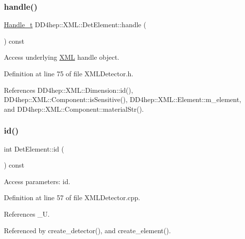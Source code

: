\subsubsection{\texorpdfstring{handle()}{handle()}}
{\footnotesize\ttfamily \hyperlink{class_d_d4hep_1_1_x_m_l_1_1_handle__t}{Handle\+\_\+t} D\+D4hep\+::\+X\+M\+L\+::\+Det\+Element\+::handle (\begin{DoxyParamCaption}{ }\end{DoxyParamCaption}) const\hspace{0.3cm}{\ttfamily [inline]}}



Access underlying \hyperlink{namespace_d_d4hep_1_1_x_m_l}{X\+ML} handle object. 



Definition at line 75 of file X\+M\+L\+Detector.\+h.



References D\+D4hep\+::\+X\+M\+L\+::\+Dimension\+::id(), D\+D4hep\+::\+X\+M\+L\+::\+Component\+::is\+Sensitive(), D\+D4hep\+::\+X\+M\+L\+::\+Element\+::m\+\_\+element, and D\+D4hep\+::\+X\+M\+L\+::\+Component\+::material\+Str().

\hypertarget{struct_d_d4hep_1_1_x_m_l_1_1_det_element_a7996df1e7f9605cb7e4ee8eae80adca3}{}\label{struct_d_d4hep_1_1_x_m_l_1_1_det_element_a7996df1e7f9605cb7e4ee8eae80adca3} 
\subsubsection{\texorpdfstring{id()}{id()}}
{\footnotesize\ttfamily int Det\+Element\+::id (\begin{DoxyParamCaption}{ }\end{DoxyParamCaption}) const}



Access parameters\+: id. 



Definition at line 57 of file X\+M\+L\+Detector.\+cpp.



References \+\_\+U.



Referenced by create\+\_\+detector(), and create\+\_\+element().

\hypertarget{struct_d_d4hep_1_1_x_m_l_1_1_det_element_a9c03d68f45b2ff358425287d93d88cd9}{}\label{struct_d_d4hep_1_1_x_m_l_1_1_det_element_a9c03d68f45b2ff358425287d93d88cd9} 
